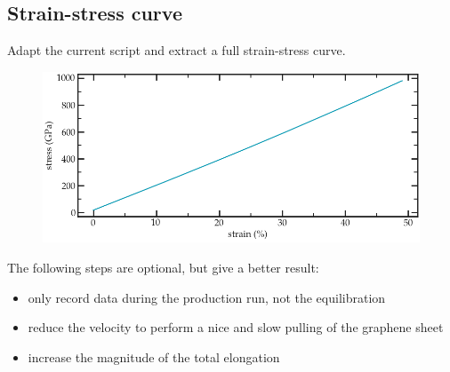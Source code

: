 \subsection{Strain-stress curve}

\noindent Adapt the current script and extract a full strain-stress curve.

\begin{figure}
\includegraphics[width=\linewidth]{tutorials/level1/breaking-a-carbon-nanotube/strain-stain-curve-light.png}
\end{figure}

\begin{tcolorbox}[colback=mylightblue!5!white,colframe=mylightblue!75!black,title=Hints]
The following steps are optional, but give a better result:
\begin{itemize}
\item only record data during the production run, not the equilibration
\item reduce the velocity to perform a nice and slow pulling of the graphene sheet
\item increase the magnitude of the total elongation
\end{itemize}
\end{tcolorbox}

